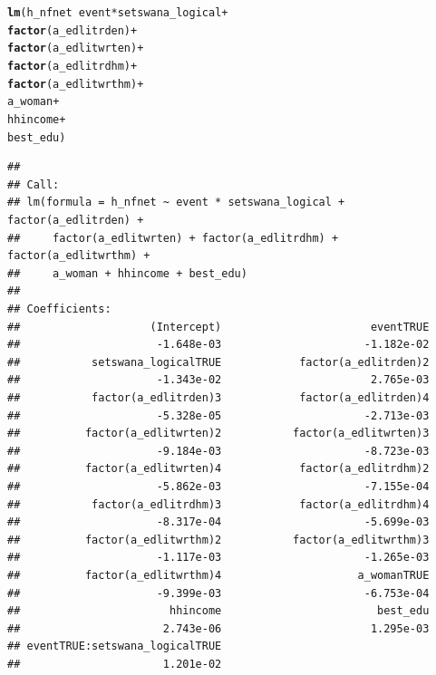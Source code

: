 \documentclass[a4paper,british]{article}\usepackage[]{graphicx}\usepackage[]{color}
\makeatletter
\newcommand{\hlopt}[1]{\textcolor[rgb]{0,0,0}{#1}}%
\newcommand{\hlstd}[1]{\textcolor[rgb]{0.345,0.345,0.345}{#1}}%
\newcommand{\hlkwd}[1]{\textcolor[rgb]{0.737,0.353,0.396}{\textbf{#1}}}%
\newenvironment{kframe}{%
 \def\at@end@of@kframe{}%
 \ifinner\ifhmode%
  \def\at@end@of@kframe{\end{minipage}}%
  \begin{minipage}{\columnwidth}%
 \fi\fi%
 \def\FrameCommand##1{\hskip\@totalleftmargin \hskip-\fboxsep
 \colorbox{shadecolor}{##1}\hskip-\fboxsep
     \hskip-\linewidth \hskip-\@totalleftmargin \hskip\columnwidth}%
 \MakeFramed {\advance\hsize-\width
   \@totalleftmargin\z@ \linewidth\hsize
   \@setminipage}}%
 {\par\unskip\endMakeFramed%
 \at@end@of@kframe}
\newenvironment{knitrout}{}{} %
\makeatother
\begin{document}
\begin{table}[H]
\caption{Living in Household that Spent on Internet (last 30 days)}
\label{tab:nfnet}

\begin{knitrout}
\color{fgcolor}\begin{kframe}
\begin{alltt}
\hlkwd{lm}\hlstd{(h_nfnet} \hlopt{~}  \hlstd{event}\hlopt{*}\hlstd{setswana_logical} \hlopt{+}
              \hlkwd{factor}\hlstd{(a_edlitrden)}    \hlopt{+}
              \hlkwd{factor}\hlstd{(a_edlitwrten)}   \hlopt{+}
              \hlkwd{factor}\hlstd{(a_edlitrdhm)}    \hlopt{+}
              \hlkwd{factor}\hlstd{(a_edlitwrthm)}   \hlopt{+}
              \hlstd{a_woman}                \hlopt{+}
              \hlstd{hhincome}               \hlopt{+}
              \hlstd{best_edu                )}
\end{alltt}
\begin{verbatim}
## 
## Call:
## lm(formula = h_nfnet ~ event * setswana_logical + factor(a_edlitrden) + 
##     factor(a_edlitwrten) + factor(a_edlitrdhm) + factor(a_edlitwrthm) + 
##     a_woman + hhincome + best_edu)
## 
## Coefficients:
##                    (Intercept)                       eventTRUE  
##                     -1.648e-03                      -1.182e-02  
##           setswana_logicalTRUE            factor(a_edlitrden)2  
##                     -1.343e-02                       2.765e-03  
##           factor(a_edlitrden)3            factor(a_edlitrden)4  
##                     -5.328e-05                      -2.713e-03  
##          factor(a_edlitwrten)2           factor(a_edlitwrten)3  
##                     -9.184e-03                      -8.723e-03  
##          factor(a_edlitwrten)4            factor(a_edlitrdhm)2  
##                     -5.862e-03                      -7.155e-04  
##           factor(a_edlitrdhm)3            factor(a_edlitrdhm)4  
##                     -8.317e-04                      -5.699e-03  
##          factor(a_edlitwrthm)2           factor(a_edlitwrthm)3  
##                     -1.117e-03                      -1.265e-03  
##          factor(a_edlitwrthm)4                     a_womanTRUE  
##                     -9.399e-03                      -6.753e-04  
##                       hhincome                        best_edu  
##                      2.743e-06                       1.295e-03  
## eventTRUE:setswana_logicalTRUE  
##                      1.201e-02
\end{verbatim}
\end{kframe}
\end{knitrout}
\end{table}
\end{document}
